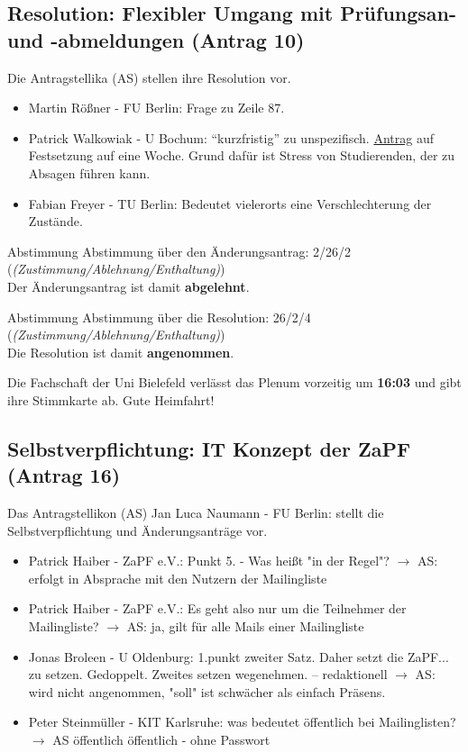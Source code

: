   \subsection{Resolution: Flexibler Umgang mit Prüfungsan- und -abmeldungen (Antrag 10)}
    Die Antragstellika (AS) stellen ihre Resolution vor.
    \begin{itemize}
      \item Martin Rößner - FU Berlin:  Frage zu Zeile 87.
      \item Patrick Walkowiak - U Bochum:  ``kurzfristig'' zu unspezifisch. \underline{Antrag} auf Festsetzung auf eine Woche. Grund dafür ist Stress von Studierenden, der zu Absagen führen kann.
      \item Fabian Freyer - TU Berlin:  Bedeutet vielerorts eine Verschlechterung der Zustände.
    \end{itemize}

    \begin{danger}{Abstimmung}
      Abstimmung über den Änderungsantrag: 2/26/2 (\textit{(Zustimmung/Ablehnung/Enthaltung)}) \\
      Der Änderungsantrag ist damit \textbf{abgelehnt}.
    \end{danger}

    \begin{success}{Abstimmung}
      Abstimmung über die Resolution: 26/2/4 (\textit{(Zustimmung/Ablehnung/Enthaltung)}) \\
      Die Resolution ist damit \textbf{angenommen}.
    \end{success}

    \begin{info}{}
      Die Fachschaft der Uni Bielefeld verlässt das Plenum vorzeitig um \textbf{16:03} und gibt ihre Stimmkarte ab. Gute Heimfahrt!
    \end{info}

  \subsection{Selbstverpflichtung: IT Konzept der ZaPF (Antrag 16)}
    Das Antragstellikon (AS) Jan Luca Naumann - FU Berlin:  stellt die Selbstverpflichtung und Änderungsanträge vor.
    \begin{itemize}
      \item Patrick Haiber - ZaPF e.V.:  Punkt 5. - Was heißt "in der Regel"?
        $\rightarrow$ AS: erfolgt in Absprache mit den Nutzern der Mailingliste
      \item Patrick Haiber - ZaPF e.V.:  Es geht also nur um die Teilnehmer der Mailingliste?
        $\rightarrow$ AS: ja, gilt für alle Mails einer Mailingliste
      \item Jonas Broleen - U Oldenburg:  1.punkt zweiter Satz. Daher setzt die ZaPF... zu setzen. Gedoppelt. Zweites setzen  wegenehmen. -- redaktionell
        $\rightarrow$ AS: wird nicht angenommen, "soll" ist schwächer als einfach Präsens.
      \item Peter Steinmüller - KIT Karlsruhe:  was bedeutet öffentlich bei Mailinglisten?
        $\rightarrow$ AS öffentlich öffentlich - ohne Passwort
    \end{itemize}

